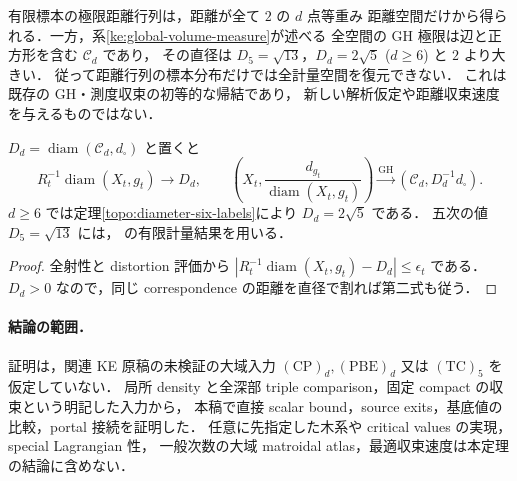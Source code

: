 \begin{remark}[測度で典型的な距離と全 GH 極限]
\label{ke:random-ke-distance-scope}
有限標本の極限距離行列は，距離が全て $2$ の $d$ 点等重み
距離空間だけから得られる．一方，系\ref{ke:global-volume-measure}が述べる
全空間の GH 極限は辺と正方形を含む $\mathcal C_d$ であり，
その直径は $D_5=\sqrt{13}$，$D_d=2\sqrt5$ ($d\ge6$) と $2$ より大きい．
従って距離行列の標本分布だけでは全計量空間を復元できない．
これは既存の GH・測度収束の初等的な帰結であり，
新しい解析仮定や距離収束速度を与えるものではない．
\end{remark}

\begin{corollary}[直径と径一の規格化]
\label{ke:global-diameter-limit}
$D_d=\operatorname{diam}(\mathcal C_d,d_\square)$ と置くと
\[
 R_t^{-1}\operatorname{diam}(X_t,g_t)\longrightarrow D_d,
 \qquad
 \left(X_t,\frac{d_{g_t}}{\operatorname{diam}(X_t,g_t)}\right)
 \xrightarrow{\mathrm{GH}}(\mathcal C_d,D_d^{-1}d_\square).
\]
$d\ge6$ では定理\ref{topo:diameter-six-labels}により $D_d=2\sqrt5$ である．
五次の値 $D_5=\sqrt{13}$ には，
\cite[\texttt{thm:intro-diameter-C5}]{KECubicalCurrent}の有限計量結果を用いる．
\end{corollary}

\begin{proof}
全射性と distortion 評価から
$|R_t^{-1}\operatorname{diam}(X_t,g_t)-D_d|\le\epsilon_t$ である．
$D_d>0$ なので，同じ correspondence の距離を直径で割れば第二式も従う．
\end{proof}

\paragraph{結論の範囲．}
証明は，関連 KE 原稿の未検証の大域入力
$\mathrm{(CP)}_d,\mathrm{(PBE)}_d$ 又は $\mathrm{(TC)}_5$ を仮定していない．
局所 density と全深部 triple comparison，固定 compact の収束という明記した入力から，
本稿で直接 scalar bound，source exits，基底値の比較，portal 接続を証明した．
任意に先指定した木系や critical values の実現，special Lagrangian 性，
一般次数の大域 matroidal atlas，最適収束速度は本定理の結論に含めない．
